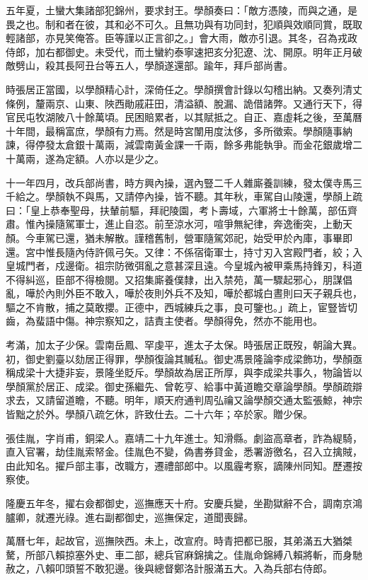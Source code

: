 \begin{pinyinscope}
五年夏，土蠻大集諸部犯錦州，要求封王。學顏奏曰：「敵方憑陵，而與之通，是畏之也。制和者在彼，其和必不可久。且無功與有功同封，犯順與效順同賞，既取輕諸部，亦見笑俺答。臣等謹以正言卻之。」會大雨，敵亦引退。其冬，召為戎政侍郎，加右都御史。未受代，而土蠻約泰寧速把亥分犯遼、沈、開原。明年正月破敵劈山，殺其長阿丑台等五人，學顏遂還部。踰年，拜戶部尚書。

時張居正當國，以學顏精心計，深倚任之。學顏撰會計錄以勾稽出納。又奏列清丈條例，釐兩京、山東、陜西勛戚莊田，清溢額、脫漏、詭借諸弊。又通行天下，得官民屯牧湖陂八十餘萬頃。民困賠累者，以其賦抵之。自正、嘉虛耗之後，至萬曆十年間，最稱富庶，學顏有力焉。然是時宮闈用度汰侈，多所徵索。學顏隨事納諫，得停發太倉銀十萬兩，減雲南黃金課一千兩，餘多弗能執爭。而金花銀歲增二十萬兩，遂為定額。人亦以是少之。

十一年四月，改兵部尚書，時方興內操，選內豎二千人雜廝養訓練，發太僕寺馬三千給之。學顏執不與馬，又請停內操，皆不聽。其年秋，車駕自山陵還，學顏上疏曰：「皇上恭奉聖母，扶輦前驅，拜祀陵園，考卜壽域，六軍將士十餘萬，部伍齊肅。惟內操隨駕軍士，進止自恣。前至涼水河，喧爭無紀律，奔逸衝突，上動天顏。今車駕已還，猶未解散。謹稽舊制，營軍隨駕郊祀，始受甲於內庫，事畢即還。宮中惟長隨內侍許佩弓矢。又律：不係宿衛軍士，持寸刃入宮殿門者，絞；入皇城門者，戍邊衛。祖宗防微弭亂之意甚深且遠。今皇城內被甲乘馬持鋒刃，科道不得糾巡，臣部不得檢閱。又招集廝養僕隸，出入禁苑，萬一驟起邪心，朋謀倡亂，嘩於內則外臣不敢入，嘩於夜則外兵不及知，嘩於都城白晝則曰天子親兵也，驅之不肯散，捕之莫敢攖。正德中，西城練兵之事，良可鑒也。」疏上，宦豎皆切齒，為蜚語中傷。神宗察知之，詰責主使者。學顏得免，然亦不能用也。

考滿，加太子少保。雲南岳鳳、罕虔平，進太子太保。時張居正既歿，朝論大異。初，御史劉臺以劾居正得罪，學顏復論其贓私。御史馮景隆論李成梁飾功，學顏亟稱成梁十大捷非妄，景隆坐貶斥。學顏故為居正所厚，與李成梁共事久，物論皆以學顏黨於居正、成梁。御史孫繼先、曾乾亨、給事中黃道瞻交章論學顏。學顏疏辯求去，又請留道瞻，不聽。明年，順天府通判周弘禴又論學顏交通太監張鯨，神宗皆黜之於外。學顏八疏乞休，許致仕去。二十六年；卒於家。贈少保。

張佳胤，字肖甫，銅梁人。嘉靖二十九年進士。知滑縣。劇盜高章者，詐為緹騎，直入官署，劫佳胤索帑金。佳胤色不變，偽書券貸金，悉署游徼名，召入立擒賊，由此知名。擢戶部主事，改職方，遷禮部郎中。以風霾考察，謫陳州同知。歷遷按察使。

隆慶五年冬，擢右僉都御史，巡撫應天十府。安慶兵變，坐勘獄辭不合，調南京鴻臚卿，就遷光祿。進右副都御史，巡撫保定，道聞喪歸。

萬曆七年，起故官，巡撫陜西。未上，改宣府。時青把都已服，其弟滿五大猶桀驁，所部八賴掠塞外史、車二部，總兵官麻錦擒之。佳胤命錦縛八賴將斬，而身馳赦之，八賴叩頭誓不敢犯邊。後與總督鄭洛計服滿五大。入為兵部右侍郎。


\end{pinyinscope}
